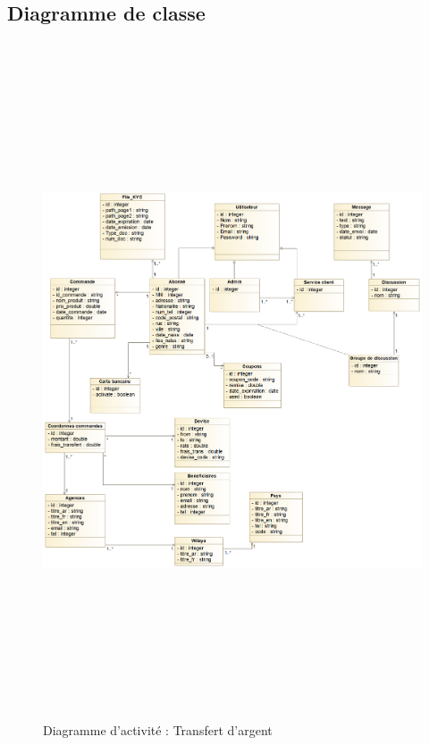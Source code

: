 \subsection{Diagramme de classe}
\begin{figure}[h!]
	\includegraphics[width=18cm, height=20cm]{./Template LaTeX/Images/Diagramme_de_classe.png}
	\caption{Diagramme d'activité : Transfert d'argent}
	\label{fig4:class}
\end{figure}


